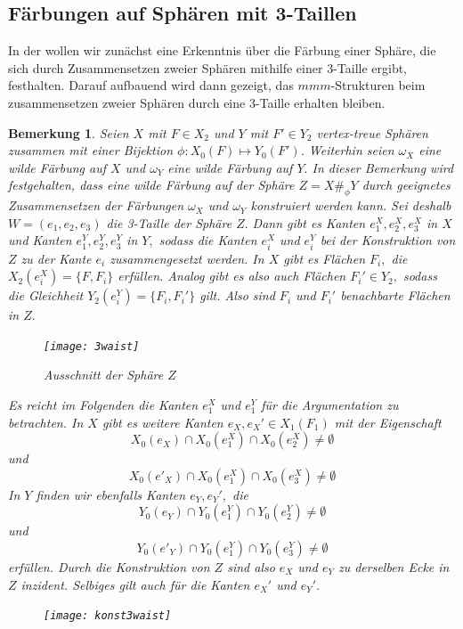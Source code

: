 \documentclass[12pt,titlepage,twoside,cleardoublepage]{article}
\theoremstyle{nummermitklammern}
\newtheorem{bemerkung}[temp]{Bemerkung}
\newtheorem{bemerkung}[zahl]{Bemerkung}
\numberwithin{equation}{section}
\begin{document}
\subsection{Färbungen auf Sphären mit 3-Taillen}
In der  wollen wir zunächst eine Erkenntnis über die Färbung einer Sphäre, die sich durch Zusammensetzen zweier Sphären mithilfe einer 3-Taille ergibt, festhalten. Darauf aufbauend wird dann gezeigt, das $mmm$-Strukturen beim zusammensetzen zweier Sphären durch eine 3-Taille erhalten bleiben.
\begin{bemerkung}\label{bemf}
Seien $X$ mit $F\in X_2$ und $Y$ mit $F'\in Y_2$ vertex-treue Sphären zusammen mit einer Bijektion $\phi:X_0(F)\mapsto Y_0(F')$. Weiterhin seien $\omega_X$ eine wilde Färbung auf $X$ und $\omega_Y$ eine wilde Färbung auf $Y.$
In dieser Bemerkung wird festgehalten, dass eine wilde Färbung auf der Sphäre $Z=X\#_{\phi}Y$ durch geeignetes Zusammensetzen der Färbungen $\omega_X$ und $\omega_Y$ konstruiert werden kann. Sei deshalb $W=(e_1,e_2,e_3)$ die 3-Taille der Sphäre $Z.$
 Dann gibt es Kanten $e_1^X,e_2^X,e_3^X$ in $X$ und Kanten $e_1^Y,e_2^Y,e_3^Y$ in $Y,$ sodass die Kanten $e_i^X$ und $e_i^Y$ bei der Konstruktion von $Z$ zu der Kante $e_i$ zusammengesetzt werden.
  In $X$ gibt es 
   Flächen $F_i,$ die $X_2(e_i^X)=\{F,F_i\}$ erfüllen.
   Analog gibt es also auch Flächen $F_i' \in Y_2,$ sodass die Gleichheit $Y_2(e_i^Y)=\{F_i,F_i'\}$ gilt. Also sind $F_i$ und $F_i'$ benachbarte Flächen in $Z.$
\begin{figure}[H]
\begin{center}
\texttt{[image: 3waist]}
\end{center}
\caption{Ausschnitt der Sphäre $Z$}
\end{figure}   
    Es reicht im Folgenden die Kanten $e_1^X$ und $e_1^Y$ für die Argumentation zu betrachten. In $X$ gibt es weitere Kanten $e_X,e_X'\in X_1(F_1)$ mit der Eigenschaft
\[
X_0(e_X)\cap X_0(e_1^X)\cap X_0(e_2^X)\neq \emptyset 
\] 
und 
\[
  X_0(e'_X)\cap X_0(e_1^X)\cap X_0(e_3^X)\neq \emptyset   
\]
In $Y$ finden wir ebenfalls Kanten $e_Y,e_Y',$ die  
\[
   Y_0(e_Y)\cap Y_0(e_1^Y)\cap Y_0(e_2^Y)\neq \emptyset 
\]
und
\[
  Y_0(e'_Y)\cap Y_0(e_1^Y)\cap Y_0(e_3^Y)\neq \emptyset   
\]
erfüllen. Durch die Konstruktion von $Z$ sind also $e_X$ und $e_Y$ zu derselben Ecke in $Z$ inzident. Selbiges gilt auch für die Kanten $e_X'$ und $e_Y'.$ 
\begin{figure}[H]
\begin{center}
\texttt{[image: konst3waist]}
\end{center}

\end{figure}
\end{bemerkung}
\end{document}
